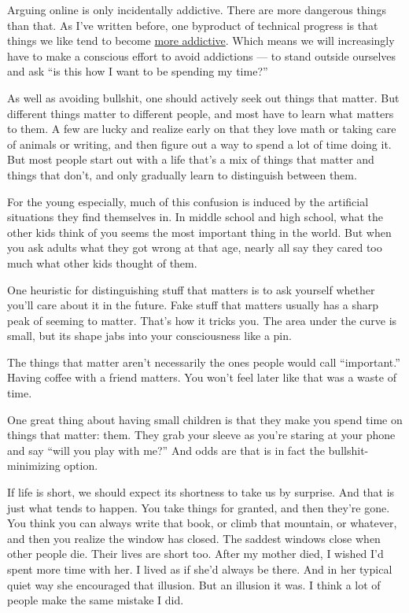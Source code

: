\documentclass[12pt]{book}
\begin{document}
Arguing online is only incidentally addictive. There are more dangerous
things than that. As I've written before, one byproduct of technical
progress is that things we like tend to become
\href{addiction.html}{more addictive}. Which means we will increasingly
have to make a conscious effort to avoid addictions --- to stand outside
ourselves and ask ``is this how I want to be spending my time?''

As well as avoiding bullshit, one should actively seek out things that
matter. But different things matter to different people, and most have
to learn what matters to them. A few are lucky and realize early on that
they love math or taking care of animals or writing, and then figure out
a way to spend a lot of time doing it. But most people start out with a
life that's a mix of things that matter and things that don't, and only
gradually learn to distinguish between them.

For the young especially, much of this confusion is induced by the
artificial situations they find themselves in. In middle school and high
school, what the other kids think of you seems the most important thing
in the world. But when you ask adults what they got wrong at that age,
nearly all say they cared too much what other kids thought of them.

One heuristic for distinguishing stuff that matters is to ask yourself
whether you'll care about it in the future. Fake stuff that matters
usually has a sharp peak of seeming to matter. That's how it tricks you.
The area under the curve is small, but its shape jabs into your
consciousness like a pin.

The things that matter aren't necessarily the ones people would call
``important.'' Having coffee with a friend matters. You won't feel later
like that was a waste of time.

One great thing about having small children is that they make you spend
time on things that matter: them. They grab your sleeve as you're
staring at your phone and say ``will you play with me?'' And odds are
that is in fact the bullshit-minimizing option.

If life is short, we should expect its shortness to take us by surprise.
And that is just what tends to happen. You take things for granted, and
then they're gone. You think you can always write that book, or climb
that mountain, or whatever, and then you realize the window has closed.
The saddest windows close when other people die. Their lives are short
too. After my mother died, I wished I'd spent more time with her. I
lived as if she'd always be there. And in her typical quiet way she
encouraged that illusion. But an illusion it was. I think a lot of
people make the same mistake I did.
\end{document}
